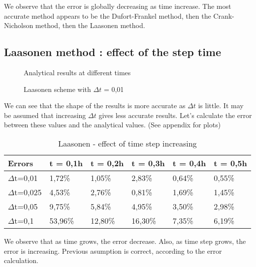 \documentclass{article}
\begin{document}
            We observe that the error is globally decreasing as time increase. The most accurate method appears to 
            be the Dufort-Frankel method, then the Crank-Nicholson method, then the Laasonen method.
    
            \subsection{Laasonen method : effect of the step time}
            \begin{figure}[H]
                \caption{Analytical results at different times}
            \end{figure}
            \begin{figure}[H]
                \caption{Laasonen scheme with $\Delta t$ = 0,01}
            \end{figure}
            
            We can see that the shape of the results is more accurate as $\Delta t$ is little.
            It may be assumed that increasing $\Delta t$ gives less accurate results.
            Let's calculate the error between these values and the analytical values. (See appendix for plots)
    
            \begin{table}[H]
                \centering
                \caption{Laasonen - effect of time step increasing }
                \label{table:laas}
                \begin{tabular}{|l|l|l|l|l|l|}
                    \hline
                    Errors    & t = 0,1h & t = 0,2h  & t = 0,3h  & t = 0,4h & t = 0,5h \\ \hline
                    $\Delta$t=0,01  & 1,72\%   & 1,05\%  & 2,83\%  & 0,64\% & 0,55\% \\ \hline
                    $\Delta$t=0,025 & 4,53\%   & 2,76\%  & 0,81\%  & 1,69\% & 1,45\% \\ \hline
                    $\Delta$t=0,05  & 9,75\%   & 5,84\%  & 4,95\%  & 3,50\% & 2,98\% \\ \hline
                    $\Delta$t=0,1   & 53,96\%  & 12,80\% & 16,30\% & 7,35\% & 6,19\% \\ \hline
                \end{tabular}
            \end{table}
    
            We observe that as time grows, the error decrease. Also, as time step grows, the error is increasing.
            Previous asumption is correct, according to the error calculation.
        \newpage
\end{document}
